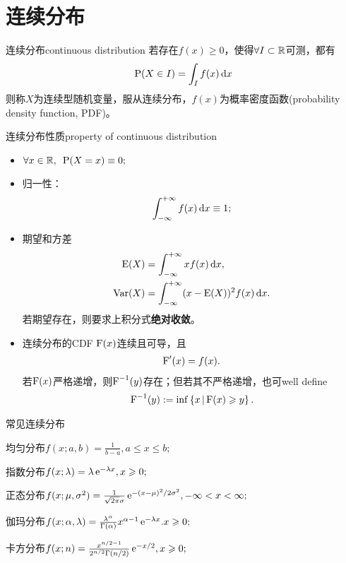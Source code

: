 \section{连续分布}
\begin{definition}{连续分布}{continuous distribution}
	若存在$f(x)\geqslant 0$，使得$\forall I\subset\mathbb R$可测，都有
	\[
		\operatorname{P}(X\in I)=\int_If(x)\mathop{}\!\mathrm{d} x
	\]
	则称$X$为连续型随机变量，服从连续分布，$f(x)$为概率密度函数(probability density function, PDF)。
\end{definition}
\begin{theorem}{连续分布性质}{property of continuous distribution}
	\begin{itemize}
		\item $\forall x\in\mathbb R,\enspace\operatorname{P}(X=x)\equiv 0;$
		\item 归一性：
			\begin{align}
				\int_{-\infty}^{+\infty} f(x)\mathop{}\!\mathrm{d} x\equiv 1;
			\end{align}
		\item 期望和方差
			\begin{align}
				\operatorname{E}(X)&=\int_{-\infty}^{+\infty} xf(x)\mathop{}\!\mathrm{d} x,\\
				\operatorname{Var}(X)&=\int_{-\infty}^{+\infty}(x-\operatorname{E}(X))^2f(x)\mathop{}\!\mathrm{d} x.
			\end{align}
			若期望存在，则要求上积分式\textbf{绝对收敛}。
		\item 连续分布的CDF $\operatorname{F}(x)$连续且可导，且
			\begin{align}
				\operatorname{F}'(x)=f(x).
			\end{align}
			若$\operatorname{F}(x)$严格递增，则$\operatorname{F}^{-1}(y)$存在；但若其不严格递增，也可well define
			\begin{align}
				\operatorname{F}^{-1}(y):=\inf\left\{x\,\middle\vert\,\operatorname{F}(x)\geqslant y\right\}.
			\end{align}
	\end{itemize}
\end{theorem}
\iffalse
\begin{example}{常见连续分布}{}
	\begin{compactenum}
		\item 均匀分布$f(x;a,b)=\frac1{b-a},a\leqslant x\leqslant b;$
		\item 指数分布$f(x;\lambda)=\lambda\mathop{}\!\mathrm{e}^{-\lambda x},x\geqslant 0;$
		\item 正态分布$f(x;\mu,\sigma^2)=\frac1{\sqrt{2\pi}\sigma}\mathop{}\!\mathrm{e}^{-(x-\mu)^2/2\sigma^2},-\infty<x<\infty;$
		\item 伽玛分布$f(x;\alpha,\lambda)=\frac{\lambda^\alpha}{\Gamma(\alpha)}x^{\alpha-1}\mathop{}\!\mathrm{e}^{-\lambda x}.x\geqslant 0;$
		\item 卡方分布$f(x;n)=\frac{x^{n/2-1}}{2^{n/2}\Gamma(n/2)}\mathop{}\!\mathrm{e}^{-x/2},x\geqslant 0;$
	\end{compactenum}
\end{example}
